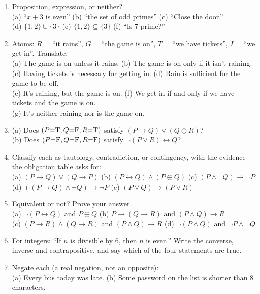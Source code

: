 \begin{enumerate}[label=\textbf{\arabic*.},leftmargin=1.8em,itemsep=0.35em]
  \item Proposition, expression, or neither?\\
  (a) ``$x+3$ is even'' \quad (b) ``the set of odd primes'' \quad (c) ``Close the door.''\\ (d) $\{1,2\}\cup\{3\}$ \quad (e) $\{1,2\}\subseteq\{3\}$ \quad (f) ``Is 7 prime?''
  \item Atoms: $R$ = ``it rains'', $G$ = ``the game is on'', $T$ = ``we have tickets'', $I$ = ``we get in''. Translate:\\
  (a) The game is on unless it rains. \quad (b) The game is on only if it isn't raining.\\
  (c) Having tickets is necessary for getting in. \quad (d) Rain is sufficient for the game to be off.\\
  (e) It's raining, but the game is on. \quad (f) We get in if and only if we have tickets and the game is on.\\
  (g) It's neither raining nor is the game on.
  \item (a) Does $(P{=}\mathrm{T},Q{=}\mathrm{F},R{=}\mathrm{T})$ satisfy $(P\to Q)\lor(Q\oplus R)$?\\
  (b) Does $(P{=}\mathrm{F},Q{=}\mathrm{F},R{=}\mathrm{F})$ satisfy $\lnot(P\lor R)\leftrightarrow Q$?
  \item Classify each as tautology, contradiction, or contingency, with the evidence the obligation table asks for:\\
  (a) $(P\to Q)\lor(Q\to P)$ \quad (b) $(P\leftrightarrow Q)\land(P\oplus Q)$ \quad (c) $(P\land\lnot Q)\to\lnot P$\\
  (d) $((P\to Q)\land\lnot Q)\to\lnot P$ \quad (e) $(P\lor Q)\to(P\lor R)$
  \item Equivalent or not? Prove your answer.\\
  (a) $\lnot(P\leftrightarrow Q)$ and $P\oplus Q$ \quad (b) $P\to(Q\to R)$ and $(P\land Q)\to R$\\
  (c) $(P\to R)\land(Q\to R)$ and $(P\land Q)\to R$ \quad (d) $\lnot(P\land Q)$ and $\lnot P\land\lnot Q$
  \item For integers: ``If $n$ is divisible by 6, then $n$ is even.'' Write the converse, inverse and contrapositive, and say which of the four statements are true.
  \item Negate each (a real negation, not an opposite):\\
  (a) Every bus today was late. \quad (b) Some password on the list is shorter than 8 characters.\\

\end{enumerate}
